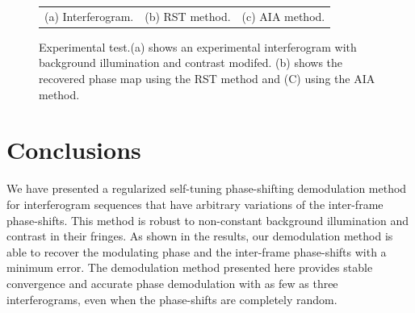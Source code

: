\documentclass[letterpaper,12pt]{article}   %
\begin{document}
\begin{figure}[h t]
\begin{center}
\begin{tabular}{c c c}
(a) Interferogram. &
(b) RST method. &
(c) AIA method.
\end{tabular}
\end{center}
\caption{Experimental test.(a) shows an experimental interferogram
  with background illumination and contrast modifed. (b) shows the
  recovered phase map using the RST method and (C) using the AIA
  method.}
\label{fig:ExpPhase}
\end{figure}


\section{Conclusions}

We have presented a regularized self-tuning phase-shifting
demodulation method for interferogram sequences that have arbitrary
variations of the inter-frame phase-shifts.  This method is robust to
non-constant background illumination and contrast in their fringes. As
shown in the results, our demodulation method is able to recover the
modulating phase and the inter-frame phase-shifts with a minimum
error. The demodulation method presented here provides stable
convergence and accurate phase demodulation with as few as three
interferograms, even when the phase-shifts are completely random.

 
\end{document}
